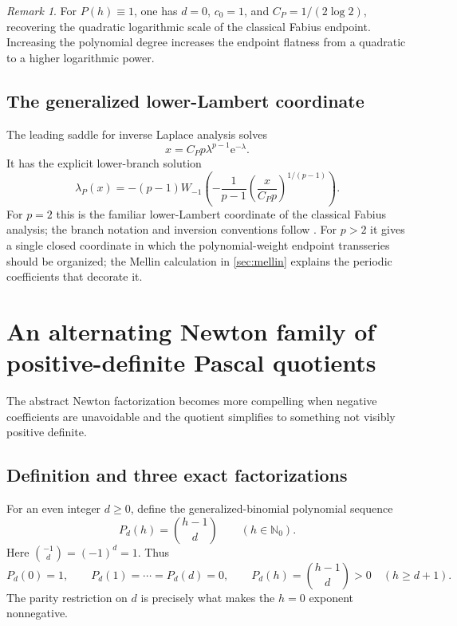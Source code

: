 \documentclass[11pt,oneside]{article}
\numberwithin{equation}{section}
\theoremstyle{definition}
\theoremstyle{remark}
\newtheorem{remark}[theorem]{Remark}
\newcommand{\N}{\mathbb N}
\newcommand{\e}{\mathrm e}
\begin{document}
\begin{remark}
For $P(h)\equiv1$, one has $d=0$, $c_0=1$, and
$C_P=1/(2\log2)$, recovering the quadratic logarithmic scale of the classical Fabius
endpoint.  Increasing the polynomial degree increases the endpoint flatness from a quadratic
to a higher logarithmic power.
\end{remark}

\subsection{The generalized lower-Lambert coordinate}

The leading saddle for inverse Laplace analysis solves
\begin{equation}
 x=C_Pp\lambda^{p-1}\e^{-\lambda}.
 \label{eq:generalized-saddle-equation}
\end{equation}
It has the explicit lower-branch solution
\begin{equation}
 \boxed{
 \lambda_P(x)
 =-(p-1)W_{-1}\!\left(
   -\frac1{p-1}
   \left(\frac{x}{C_Pp}\right)^{1/(p-1)}
 \right).}
 \label{eq:generalized-lambert}
\end{equation}
For $p=2$ this is the familiar lower-Lambert coordinate of the classical Fabius analysis;
the branch notation and inversion conventions follow \cite{corless1996}.
For $p>2$ it gives a single closed coordinate in which the polynomial-weight endpoint
transseries should be organized; the Mellin calculation in \cref{sec:mellin} explains the
periodic coefficients that decorate it.


\section{An alternating Newton family of positive-definite Pascal quotients}
\label{sec:alternating-family}

The abstract Newton factorization becomes more compelling when negative coefficients are
unavoidable and the quotient simplifies to something not visibly positive definite.

\subsection{Definition and three exact factorizations}

For an even integer $d\ge0$, define the generalized-binomial polynomial sequence
\begin{equation}
 P_d(h)=\binom{h-1}{d}
 \qquad(h\in\N_0).
 \label{eq:Pd-def}
\end{equation}
Here $\binom{-1}{d}=(-1)^d=1$.  Thus
\begin{equation}
 P_d(0)=1,
 \qquad
 P_d(1)=\cdots=P_d(d)=0,
 \qquad
 P_d(h)=\binom{h-1}{d}>0\quad(h\ge d+1).
 \label{eq:Pd-nonnegative}
\end{equation}
The parity restriction on $d$ is precisely what makes the $h=0$ exponent nonnegative.
\end{document}
